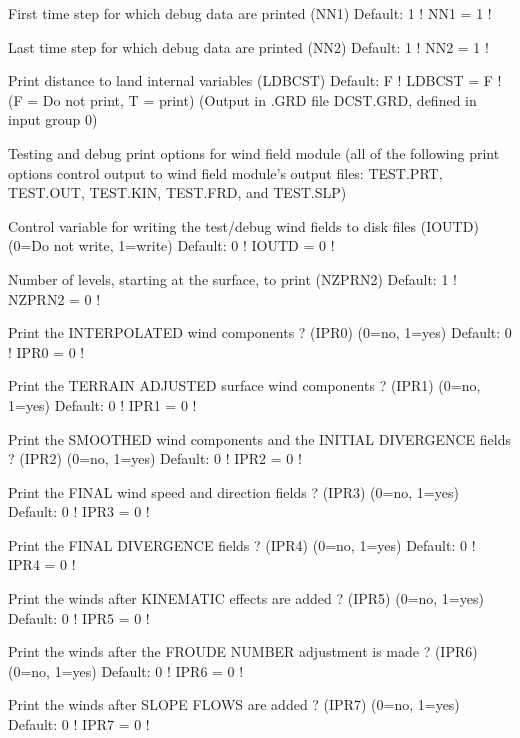 \documentclass[a4paper,10pt]{article}
\begin{document}
          First time step for which debug data
          are printed (NN1)                Default: 1       ! NN1 =  1  !

          Last time step for which debug data
          are printed (NN2)                Default: 1       ! NN2 =  1  !

          Print distance to land
          internal variables (LDBCST)      Default: F       ! LDBCST = F !
          (F = Do not print, T = print)
          (Output in .GRD file DCST.GRD, defined in input group 0)

       Testing and debug print options for wind field module
       (all of the following print options control output to
        wind field module's output files: TEST.PRT, TEST.OUT,
        TEST.KIN, TEST.FRD, and TEST.SLP)

          Control variable for writing the test/debug
          wind fields to disk files (IOUTD)
          (0=Do not write, 1=write)        Default: 0       ! IOUTD =  0  !

          Number of levels, starting at the surface,
          to print (NZPRN2)                Default: 1       ! NZPRN2 =  0  !

          Print the INTERPOLATED wind components ?
          (IPR0) (0=no, 1=yes)             Default: 0       !  IPR0 =  0  !

          Print the TERRAIN ADJUSTED surface wind
          components ?
          (IPR1) (0=no, 1=yes)             Default: 0       !  IPR1 =  0  !

          Print the SMOOTHED wind components and
          the INITIAL DIVERGENCE fields ?
          (IPR2) (0=no, 1=yes)             Default: 0       !  IPR2 =  0  !

          Print the FINAL wind speed and direction
          fields ?
          (IPR3) (0=no, 1=yes)             Default: 0       !  IPR3 =  0  !

          Print the FINAL DIVERGENCE fields ?
          (IPR4) (0=no, 1=yes)             Default: 0       !  IPR4 =  0  !

          Print the winds after KINEMATIC effects
          are added ?
          (IPR5) (0=no, 1=yes)             Default: 0       !  IPR5 =  0  !

          Print the winds after the FROUDE NUMBER
          adjustment is made ?
          (IPR6) (0=no, 1=yes)             Default: 0       !  IPR6 =  0  !

          Print the winds after SLOPE FLOWS
          are added ?
          (IPR7) (0=no, 1=yes)             Default: 0       !  IPR7 =  0  !
\end{document}
